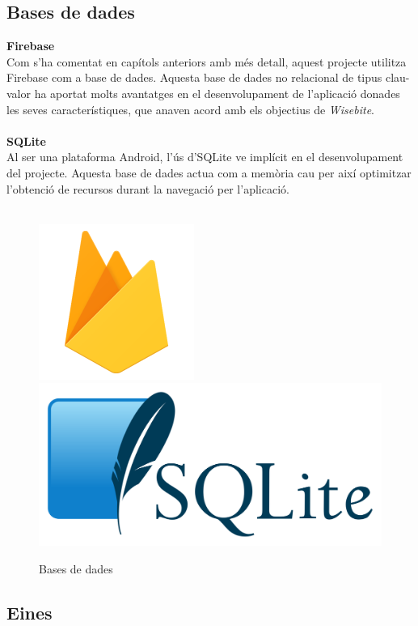 \subsection{Bases de dades}

\textbf{\large Firebase}\cite{firebase}\\
Com s'ha comentat en capítols anteriors amb més detall, aquest projecte utilitza Firebase com a base de dades. Aquesta base de dades no relacional de tipus clau-valor ha aportat molts avantatges en el desenvolupament de l'aplicació donades les seves característiques, que anaven acord amb els objectius de \textit{Wisebite}.
\\\\
\textbf{\large SQLite}\cite{sqlite}\\
Al ser una plataforma Android, l'ús d'SQLite ve implícit en el desenvolupament del projecte. Aquesta base de dades actua com a memòria cau per així optimitzar l'obtenció de recursos durant la navegació per l'aplicació.
\\\\
\begin{figure}[H]
\centering
\includegraphics[scale=0.30]{Figures/firebase.png}
\includegraphics[scale=0.10]{Figures/sqlite.png}
\caption{Bases de dades}
\end{figure}

\subsection{Eines}


